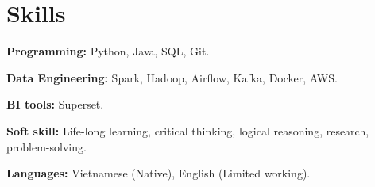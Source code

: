 \documentclass[letterpaper,11pt]{article}
\makeatletter
\newcommand{\resumeItem}[1]{
  \item\small{
    {#1 \vspace{-2pt}}
  }
}
\newcommand{\resumeSubheading}[4]{
  \vspace{-2pt}\item
    \begin{tabular*}{0.97\textwidth}[t]{l@{\extracolsep{\fill}}r}
      \textbf{#1} & #2 \\
      \textit{\small#3} & \textit{\small #4} \\
    \end{tabular*}\vspace{-7pt}
}
\newcommand{\resumeSubHeadingListStart}{\begin{itemize}[leftmargin=0.15in, label={}]}
\newcommand{\resumeSubHeadingListEnd}{\end{itemize}}
\newcommand{\resumeItemListStart}{\begin{itemize}}
\newcommand{\resumeItemListEnd}{\end{itemize}\vspace{-5pt}}
\makeatother
\begin{document}

\section{Skills}
\vspace{2pt}
\resumeSubHeadingListStart
  \small{\item{
      \textbf{Programming:}{ Python, Java, SQL, Git.} \\ \vspace{3pt}
      
      
      \textbf{Data Engineering:}{ Spark, Hadoop, Airflow, Kafka, Docker, AWS.} \\ \vspace{3pt}

      \textbf{BI tools:}{ Superset.} \\ \vspace{3pt}

      \textbf{Soft skill:}{ Life-long learning, critical thinking, logical reasoning, 
      research, problem-solving.} \\ \vspace{3pt}

      \textbf{Languages:}{ Vietnamese (Native), English (Limited working).}
      
  }}
\resumeSubHeadingListEnd


  
    
\end{document}
